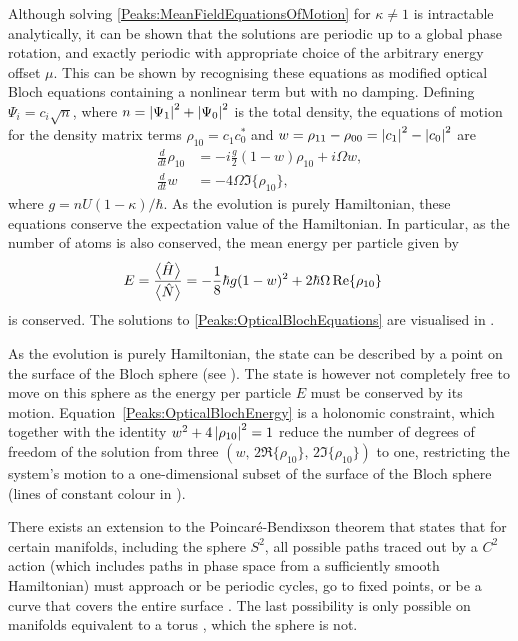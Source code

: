 Although solving \eqref{Peaks:MeanFieldEquationsOfMotion} for $\kappa \neq 1$ is intractable analytically, it can be shown that the solutions are periodic up to a global phase rotation, and exactly periodic with appropriate choice of the arbitrary energy offset $\mu$. This can be shown by recognising these equations as modified optical Bloch equations \citep[\S 5.B]{Scully} containing a nonlinear term but with no damping. Defining $\Psi_i = c_i\sqrt{n}$, where $n = \left|\Psi_1\right|^2 + \left|\Psi_0\right|^2$ is the total density, the equations of motion for the density matrix terms $\rho_{10} = c_{1}^{}c_{0}^*$ and $w = \rho_{11}-\rho_{00} = \left|c_1\right|^2 - \left|c_0\right|^2$ are
\begin{subequations}
    \label{Peaks:OpticalBlochEquations}
    \begin{align}
        \frac{d}{dt}\rho_{10} &= -i\frac{g}{2} (1-w)\rho_{10} + i \Omega w,\\
        \frac{d }{dt}w &= -4 \Omega \Im\{\rho_{10}\},
    \end{align}
\end{subequations}
where $g = n U (1-\kappa)/\hbar$. As the evolution is purely Hamiltonian, these equations conserve the expectation value of the Hamiltonian. In particular, as the number of atoms is also conserved, the mean energy per particle given by
\begin{align}
    E &= \frac{\mean{\hat{H}}}{\mean{\hat{N}}} = -\frac{1}{8}\hbar g(1 - w)^2 + 2 \hbar \Omega \Re\{\rho_{10}\}
    \label{Peaks:OpticalBlochEnergy}
\end{align}
is conserved. The solutions to \eqref{Peaks:OpticalBlochEquations} are visualised in .

As the evolution is purely Hamiltonian, the state can be described by a point on the surface of the Bloch sphere (see ).  The state is however not completely free to move on this sphere as the energy per particle $E$ must be conserved by its motion.  Equation~\eqref{Peaks:OpticalBlochEnergy} is a holonomic constraint, which together with the identity $w^2 + 4 \left|\rho_{10}\right|^2 = 1$ reduce the number of degrees of freedom of the solution from three $(w,\, 2\Re\{\rho_{10}\},\, 2\Im\{\rho_{10}\})$ to one, restricting the system's motion to a one-dimensional subset of the surface of the Bloch sphere (lines of constant colour in ).  

There exists an extension to the Poincaré-Bendixson theorem that states that for certain manifolds, including the sphere $S^2$, all possible paths traced out by a $C^2$ action (which includes paths in phase space from a sufficiently smooth Hamiltonian) must approach or be periodic cycles, go to fixed points, or be a curve that covers the entire surface \citep{Schwartz:1963}.  The last possibility is only possible on manifolds equivalent to a torus \citep{Schwartz:1963}, which the sphere is not.

